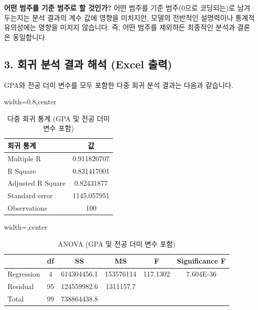 \documentclass[11pt,a4paper]{article}
\begin{document}
\begin{tipbox}
\textbf{어떤 범주를 기준 범주로 할 것인가?}
어떤 범주를 기준 범주(0으로 코딩되는)로 남겨두는지는 분석 결과의 계수 값에 영향을 미치지만, 모델의 전반적인 설명력이나 통계적 유의성에는 영향을 미치지 않습니다. 즉, 어떤 범주를 제외하든 최종적인 분석과 결론은 동일합니다.
\end{tipbox}

\subsection*{3. 회귀 분석 결과 해석 (Excel 출력)}
GPA와 전공 더미 변수를 모두 포함한 다중 회귀 분석 결과는 다음과 같습니다.

\begin{table}[htbp]
\centering
\caption{다중 회귀 통계 (GPA 및 전공 더미 변수 포함)}
\label{tab:multi_reg_gpa_major}
\begin{adjustbox}{width=0.8\textwidth,center}
\begin{tabular}{lc}
\toprule
\textbf{회귀 통계} & \textbf{값} \\
\midrule
Multiple R & 0.911820707 \\
R Square & 0.831417001 \\
Adjusted R Square & 0.82431877 \\
Standard error & 1145.057951 \\
Observations & 100 \\
\bottomrule
\end{tabular}
\end{adjustbox}
\end{table}

\begin{table}[htbp]
\centering
\caption{ANOVA (GPA 및 전공 더미 변수 포함)}
\label{tab:anova_gpa_major}
\begin{adjustbox}{width=\textwidth,center}
\begin{tabular}{lccccc}
\toprule
\textbf{} & \textbf{df} & \textbf{SS} & \textbf{MS} & \textbf{F} & \textbf{Significance F} \\
\midrule
Regression & 4 & 614304456.1 & 153576114 & 117.1302 & 7.604E-36 \\
Residual & 95 & 124559982.6 & 1311157.7 & & \\
Total & 99 & 738864438.8 & & & \\
\bottomrule
\end{tabular}
\end{adjustbox}
\end{table}
\end{document}
